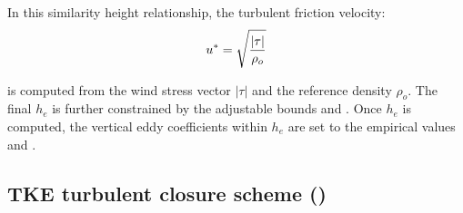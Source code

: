 \documentclass[../tex_main/NEMO_manual]{subfiles}
\begin{document}
In this similarity height relationship, the turbulent friction velocity:
\begin{equation}
         u^{*} = \sqrt \frac {|\tau|} {\rho_o}  	\\
\end{equation}

is computed from the wind stress vector $|\tau|$ and the reference density $ \rho_o$.
The final $h_{e}$ is further constrained by the adjustable bounds  and .
Once $h_{e}$ is computed, the vertical eddy coefficients within $h_{e}$ are set to 
the empirical values  and  \citep{Lermusiaux2001}.

\subsection{TKE turbulent closure scheme (\protect{})}
\label{subsec:ZDF_tke}


\end{document}
